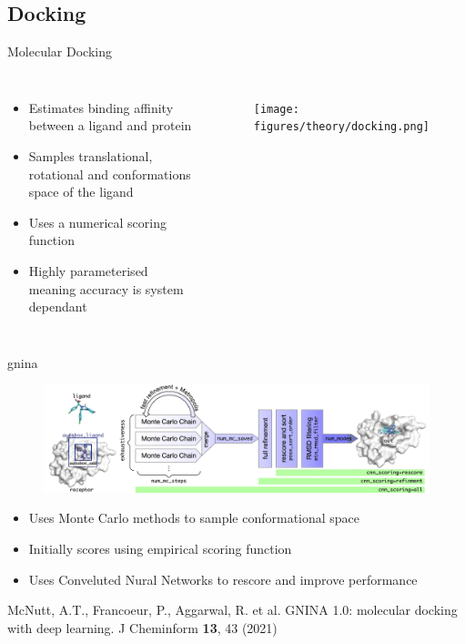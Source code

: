\subsection{Docking}
\begin{frame}{Molecular Docking}
\begin{columns}
\begin{itemize}
	\item Estimates binding affinity between a ligand and protein
	\item Samples translational, rotational and conformations space of the ligand
	\item Uses a numerical scoring function	
	\item Highly parameterised meaning accuracy is system dependant
\end{itemize}
\begin{figure}
\texttt{[image: figures/theory/docking.png]}
\end{figure}
\end{columns}
\end{frame}

\begin{frame}{gnina}
\begin{figure}
\includegraphics[height=0.4\textheight]{figures/theory/gnina.png}
\end{figure}
\begin{itemize}
	\item Uses Monte Carlo methods to sample conformational space
	\item Initially scores using empirical scoring function
	\item Uses Conveluted Nural Networks to rescore and improve performance
\end{itemize}
{\tiny
McNutt, A.T., Francoeur, P., Aggarwal, R. et al. GNINA 1.0: molecular docking with deep learning. J Cheminform \textbf{13}, 43 (2021)}
\end{frame}